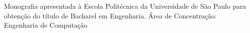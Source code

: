 {\large
  Monografia apresentada à Escola Politécnica da Universidade de São Paulo para obtenção do título de Bacharel em Engenharia.\newline
  \newline
  Área de Concentração:\newline
  Engenharia de Computação\newline
}